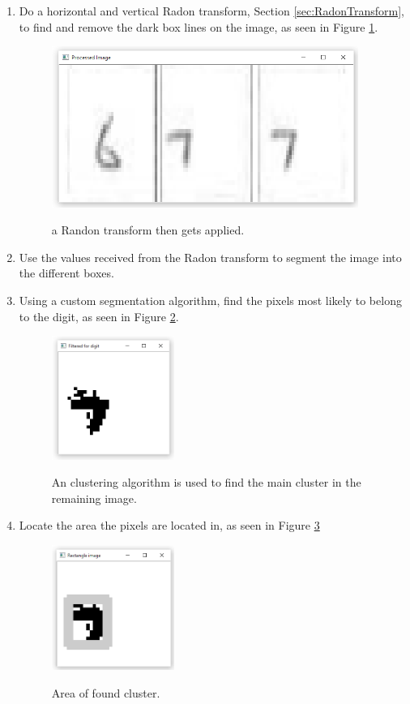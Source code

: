\begin{enumerate}
\item Do a horizontal and vertical Radon transform, Section \ref{sec:RadonTransform}, to find and remove the dark box lines on the image, as seen in Figure \ref{fig:ar}.

\begin{figure}
  \centering
  \includegraphics[width=10cm]{AfterRadon}\\
  \caption{a Randon transform then gets applied.}
  \label{fig:ar}
\end{figure}

\item Use the values received from the Radon transform to segment the image into the different boxes.
\item Using a custom segmentation algorithm, find the pixels most likely to belong to the digit, as seen in Figure \ref{fig:c}.

\begin{figure}
  \centering
  \includegraphics[width=4cm]{Cluster}\\
  \caption{An clustering algorithm is used to find the main cluster in the remaining image.}
  \label{fig:c}
\end{figure}

\item Locate the area the pixels are located in, as seen in Figure \ref{fig:areaLoc}

\begin{figure}
  \centering
  \includegraphics[width=4cm]{DetectArea}\\
  \caption{Area of found cluster.}
  \label{fig:areaLoc}
\end{figure}


\end{enumerate}
